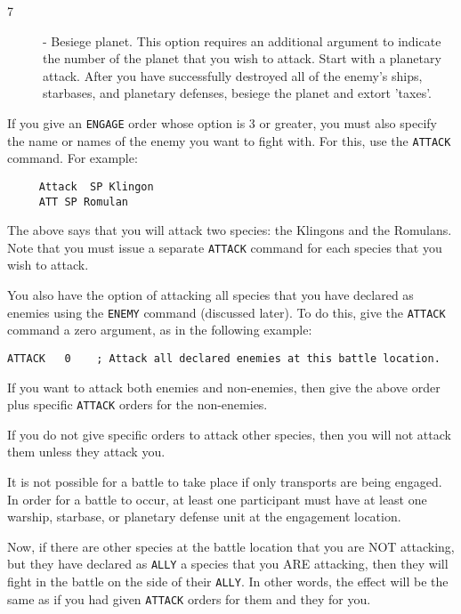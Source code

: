 \documentclass[10pt,titlepage]{article}
\begin{document}
\begin{description}
	\item[7] -	Besiege planet.  This option requires an additional argument
		to indicate the number of the planet that you wish to attack.
		Start with a planetary attack.  After you have successfully
		destroyed all of the enemy's ships, starbases, and planetary
		defenses, besiege the planet and extort 'taxes'.
\end{description}

If you give an \texttt{ENGAGE} order whose option is 3 or greater, you must also specify
the name or names of the enemy you want to fight with.  For this, use the
\texttt{ATTACK} command.  For example:

\begin{verbatim}
     Attack  SP Klingon
     ATT SP Romulan\end{verbatim} 

The above says that you will attack two species: the Klingons and the Romulans.
Note that you must issue a separate \texttt{ATTACK} command for each species that you
wish to attack.

You also have the option of attacking all species that you have declared as
enemies using the \texttt{ENEMY} command (discussed later).  To do this, give the \texttt{ATTACK}
command a zero argument, as in the following example:

\begin{verbatim}
ATTACK   0    ; Attack all declared enemies at this battle location.	\end{verbatim} 

If you want to attack both enemies and non-enemies, then give the above order
plus specific \texttt{ATTACK} orders for the non-enemies.

If you do not give specific orders to attack other species, then you will not
attack them unless they attack you.

\begin{importantnote}
    It is not possible for a battle to take place if only transports are being
    engaged.  In order for a battle to occur, at least one participant must
    have at least one warship, starbase, or planetary defense unit at the
    engagement location.
\end{importantnote}

Now, if there are other species at the battle location that you are NOT
attacking, but they have declared as \texttt{ALLY} a species that you ARE attacking,
then they will fight in the battle on the side of their \texttt{ALLY}.  In other
words, the effect will be the same as if you had given \texttt{ATTACK} orders for
them and they for you.
\end{document}
